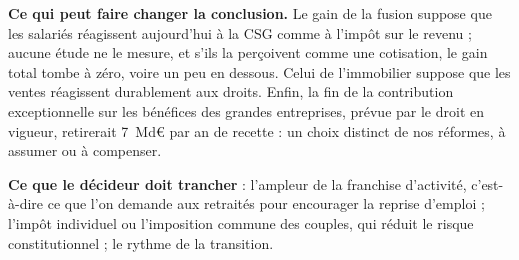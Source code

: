 \textbf{Ce qui peut faire changer la conclusion.} Le gain de la fusion suppose que les salariés réagissent aujourd'hui
à la CSG comme à l'impôt sur le revenu ; aucune étude ne le mesure, et s'ils la perçoivent comme une cotisation, le gain
total tombe à zéro, voire un peu en dessous. Celui de l'immobilier suppose que les ventes réagissent durablement aux droits. Enfin, la fin de la
contribution exceptionnelle sur les bénéfices des grandes entreprises, prévue par le droit en vigueur, retirerait
7~Md€ par an de recette : un choix distinct de nos réformes, à assumer ou à compenser.

\textbf{Ce que le décideur doit trancher} : l'ampleur de la franchise d'activité, c'est-à-dire ce que l'on demande
aux retraités pour encourager la reprise d'emploi ; l'impôt individuel ou l'imposition commune des couples, qui
réduit le risque constitutionnel ; le rythme de la transition.
